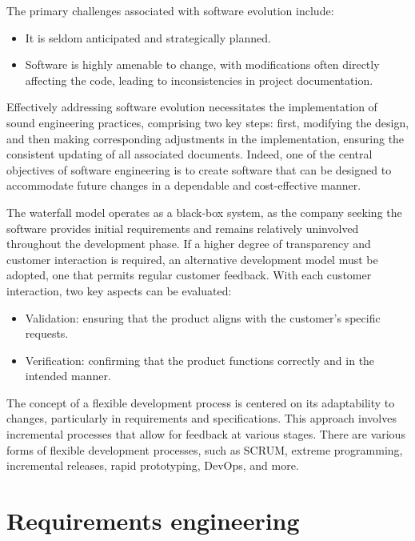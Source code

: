 \documentclass[12pt, a4paper]{report}
\begin{document}
    The primary challenges associated with software evolution include:
    \begin{itemize}
        \item It is seldom anticipated and strategically planned.
        \item Software is highly amenable to change, with modifications often directly affecting the code, leading to inconsistencies in project documentation.
    \end{itemize}
    Effectively addressing software evolution necessitates the implementation of sound engineering practices, comprising two key steps: first, modifying the design, and then making corresponding adjustments in the implementation, ensuring the consistent updating of all associated documents.
    Indeed, one of the central objectives of software engineering is to create software that can be designed to accommodate future changes in a dependable and cost-effective manner.

    The waterfall model operates as a black-box system, as the company seeking the software provides initial requirements and remains relatively uninvolved throughout the development phase. 
    If a higher degree of transparency and customer interaction is required, an alternative development model must be adopted, one that permits regular customer feedback. With each customer interaction, two key aspects can be evaluated:
    \begin{itemize}
        \item Validation: ensuring that the product aligns with the customer's specific requests.
        \item Verification: confirming that the product functions correctly and in the intended manner.
    \end{itemize}
    The concept of a flexible development process is centered on its adaptability to changes, particularly in requirements and specifications.
    This approach involves incremental processes that allow for feedback at various stages.
    There are various forms of flexible development processes, such as SCRUM, extreme programming, incremental releases, rapid prototyping, DevOps, and more.

\newpage

\chapter{Requirements engineering}
\end{document}
